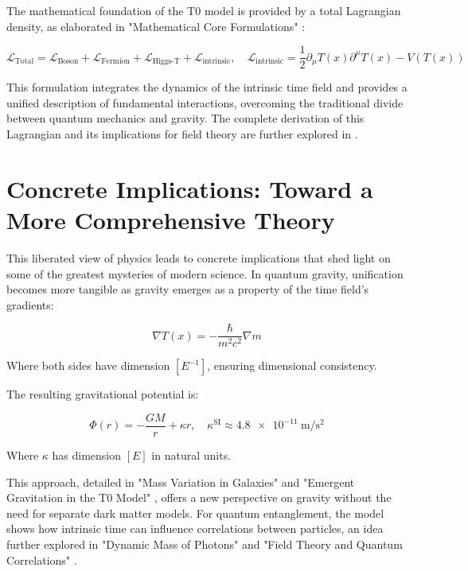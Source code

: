 \documentclass[a4paper,12pt]{article}
\newcommand{\Tfield}{T(x)}
\begin{document}
	The mathematical foundation of the T0 model is provided by a total Lagrangian density, as elaborated in "Mathematical Core Formulations" \cite{pascher_lagrange_2025}:
	
	\begin{equation}
		\mathcal{L}_{\text{Total}} = \mathcal{L}_{\text{Boson}} + \mathcal{L}_{\text{Fermion}} + \mathcal{L}_{\text{Higgs-T}} + \mathcal{L}_{\text{intrinsic}}, \quad \mathcal{L}_{\text{intrinsic}} = \frac{1}{2} \partial_\mu \Tfield \partial^\mu \Tfield - V(\Tfield)
	\end{equation}
	
	This formulation integrates the dynamics of the intrinsic time field and provides a unified description of fundamental interactions, overcoming the traditional divide between quantum mechanics and gravity. The complete derivation of this Lagrangian and its implications for field theory are further explored in \cite{pascher_feldtheorie_2025}.
	
	\section{Concrete Implications: Toward a More Comprehensive Theory}
	
	This liberated view of physics leads to concrete implications that shed light on some of the greatest mysteries of modern science. In quantum gravity, unification becomes more tangible as gravity emerges as a property of the time field's gradients:
	
	\begin{equation}
		\nabla \Tfield = -\frac{\hbar}{m^2 c^2} \nabla m
	\end{equation}
	
	Where both sides have dimension \([E^{-1}]\), ensuring dimensional consistency.
	
	The resulting gravitational potential is:
	
	\begin{equation}
		\Phi(r) = -\frac{G M}{r} + \kappa r, \quad \kappa^{\text{SI}} \approx \SI{4.8e-11}{\meter\per\second\squared}
	\end{equation}
	
	Where \(\kappa\) has dimension \([E]\) in natural units.
	
	This approach, detailed in "Mass Variation in Galaxies" \cite{pascher_galaxies_2025} and "Emergent Gravitation in the T0 Model" \cite{pascher_emergente_gravitation_2025}, offers a new perspective on gravity without the need for separate dark matter models. For quantum entanglement, the model shows how intrinsic time can influence correlations between particles, an idea further explored in "Dynamic Mass of Photons" \cite{pascher_photons_2025} and "Field Theory and Quantum Correlations" \cite{pascher_feldtheorie_2025}.
	
\end{document}
